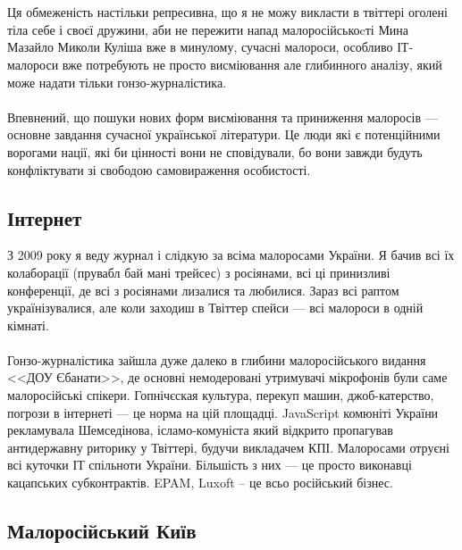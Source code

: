 \\
\\
Ця обмеженість настільки репресивна, що я не можу викласти в твіттері
оголені тіла себе і своєї дружини, аби не пережити напад малоросійськоcті
Мина Мазайло Миколи Куліша вже в минулому, сучасні малороси, особливо ІТ-малороси
вже потребують не просто висміювання але глибинного аналізу, який може надати
тільки гонзо-журналістика.
\\
\\
Впевнений, що пошуки нових форм висміювання та приниження малоросів ---
основне завдання сучасної української літератури. Це люди які є потенційними
ворогами нації, які би цінності вони не сповідували, бо вони завжди будуть конфліктувати зі свободою самовираження особистості.

\subsection{Інтернет}
З 2009 року я веду журнал і слідкую за всіма малоросами України.
Я бачив всі їх колаборації (прувабл бай мані трейсес) з росіянами,
всі ці принизливі конференції, де всі з росіянами лизалися та любилися.
Зараз всі раптом українізувалися, але коли заходиш в Твіттер спейси ---
всі малороси в одній кімнаті. 
\\
\\
Гонзо-журналістика зайшла дуже далеко в глибини малоросійського
видання <<ДОУ Єбанати>>, де основні немодеровані утримувачі мікрофонів
були саме малоросійські спікери. Гопнічєская культура, перекуп машин,
джоб-катерство, погрози в інтернеті --- це норма на цій площадці. JavaScript
комюніті України рекламувала Шемседінова, ісламо-комуніста який відкрито
пропагував антидержавну риторику у Твіттері, будучи викладачем КПІ.
Малоросами отруєні всі куточки ІТ спільноти України. Більшість з них ---
це просто виконавці кацапських субконтрактів. EPAM, Luxoft -- це всьо російський бізнес.

\subsection{Малоросійський Київ}

